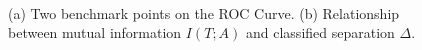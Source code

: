 \documentclass[11pt,letterpaper]{article}
\begin{document}
\begin{figure}
\centering
{}
$\qquad$
\caption{(a) Two benchmark points on the ROC Curve.  (b) Relationship between mutual information $I(T;A)$ and classified separation $\Delta$.}
\end{figure}
\end{document}
